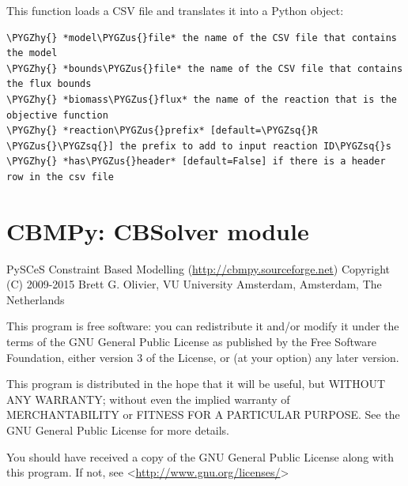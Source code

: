 \documentclass[a4paper,11pt,english]{sphinxmanual}
\def\PYGZus{\char`\_}
\def\PYGZhy{\char`\-}
\def\PYGZsq{\char`\'}
\renewcommand\PYGZsq{\textquotesingle}
\begin{document}
\begin{fulllineitems}
\label{modules_doc:cbmpy.CBReadtxt.readCSV}
This function loads a CSV file and translates it into a Python object:

\begin{Verbatim}[commandchars=\\\{\}]
\PYGZhy{} *model\PYGZus{}file* the name of the CSV file that contains the model
\PYGZhy{} *bounds\PYGZus{}file* the name of the CSV file that contains the flux bounds
\PYGZhy{} *biomass\PYGZus{}flux* the name of the reaction that is the objective function
\PYGZhy{} *reaction\PYGZus{}prefix* [default=\PYGZsq{}R \PYGZus{}\PYGZsq{}] the prefix to add to input reaction ID\PYGZsq{}s
\PYGZhy{} *has\PYGZus{}header* [default=False] if there is a header row in the csv file
\end{Verbatim}

\end{fulllineitems}

\label{modules_doc:module-cbmpy.CBSolver}

\section{CBMPy: CBSolver module}
\label{modules_doc:cbmpy-cbsolver-module}
PySCeS Constraint Based Modelling (\href{http://cbmpy.sourceforge.net}{http://cbmpy.sourceforge.net})
Copyright (C) 2009-2015 Brett G. Olivier, VU University Amsterdam, Amsterdam, The Netherlands

This program is free software: you can redistribute it and/or modify
it under the terms of the GNU General Public License as published by
the Free Software Foundation, either version 3 of the License, or
(at your option) any later version.

This program is distributed in the hope that it will be useful,
but WITHOUT ANY WARRANTY; without even the implied warranty of
MERCHANTABILITY or FITNESS FOR A PARTICULAR PURPOSE.  See the
GNU General Public License for more details.

You should have received a copy of the GNU General Public License
along with this program.  If not, see \textless{}\href{http://www.gnu.org/licenses/}{http://www.gnu.org/licenses/}\textgreater{}
\end{document}
